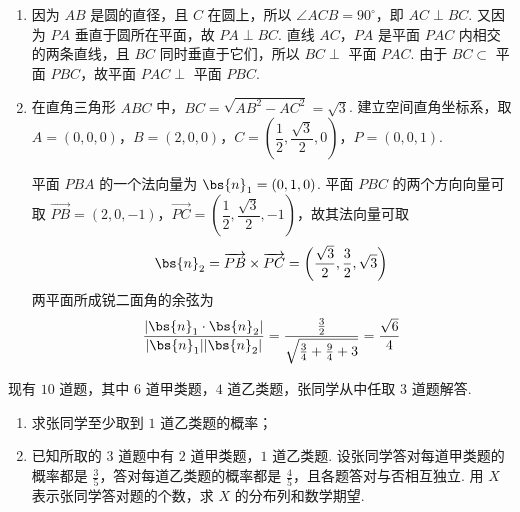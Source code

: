 \begin{solution}
\begin{enumerate}
\item 因为 \(AB\) 是圆的直径，且 \(C\) 在圆上，所以 \(\angle ACB=90^\circ\)，即 \(AC\perp BC\). 又因为 \(PA\) 垂直于圆所在平面，故 \(PA\perp BC\). 直线 \(AC\)，\(PA\) 是平面 \(PAC\) 内相交的两条直线，且 \(BC\) 同时垂直于它们，所以 \(BC\perp\) 平面 \(PAC\). 由于 \(BC\subset\) 平面 \(PBC\)，故平面 \(PAC\perp\) 平面 \(PBC\).

\item 在直角三角形 \(ABC\) 中，\(BC=\sqrt{AB^2-AC^2}=\sqrt3\). 建立空间直角坐标系，取
\(A=(0,0,0)\)，\(B=(2,0,0)\)，\(C=\left(\dfrac12,\dfrac{\sqrt3}{2},0\right)\)，\(P=(0,0,1)\).

平面 \(PBA\) 的一个法向量为 \(\bs{n}_1=(0,1,0)\). 平面 \(PBC\) 的两个方向向量可取 \(\overrightarrow{PB}=(2,0,-1)\)，\(\overrightarrow{PC}=\left(\dfrac12,\dfrac{\sqrt3}{2},-1\right)\)，故其法向量可取
\[
\bs{n}_2=\overrightarrow{PB}\times\overrightarrow{PC}=\left(\frac{\sqrt3}{2},\frac32,\sqrt3\right)
\]
两平面所成锐二面角的余弦为
\[
\frac{\lvert\bs{n}_1\cdot\bs{n}_2\rvert}{\lvert\bs{n}_1\rvert\lvert\bs{n}_2\rvert}
=\frac{\frac32}{\sqrt{\frac34+\frac94+3}}=\frac{\sqrt6}{4}
\]
\end{enumerate}
\end{solution}

\begin{problem}
现有 \(10\) 道题，其中 \(6\) 道甲类题，\(4\) 道乙类题，张同学从中任取 \(3\) 道题解答.

\begin{enumerate}
\item 求张同学至少取到 \(1\) 道乙类题的概率；
\item 已知所取的 \(3\) 道题中有 \(2\) 道甲类题，\(1\) 道乙类题. 设张同学答对每道甲类题的概率都是 \(\frac{3}{5}\)，答对每道乙类题的概率都是 \(\frac{4}{5}\)，且各题答对与否相互独立. 用 \(X\) 表示张同学答对题的个数，求 \(X\) 的分布列和数学期望.
\end{enumerate}
\end{problem}

